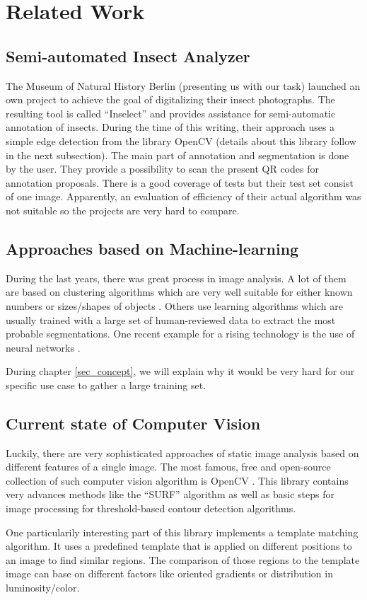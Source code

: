 %
\section{Related Work}
\label{sec_related}

\subsection{Semi-automated Insect Analyzer}

The Museum of Natural History Berlin (presenting us with our task) launched an own project to achieve the goal of digitalizing their insect photographs. 
The resulting tool is called ``Inselect'' \cite{Inselect} and provides assistance for semi-automatic annotation of insects. 
During the time of this writing, their approach uses a simple edge detection from the library OpenCV (details about this library follow in the next subsection).
The main part of annotation and segmentation is done by the user. 
They provide a possibility to scan the present QR codes for annotation proposals.
There is a good coverage of tests but their test set consist of one image. 
Apparently, an evaluation of efficiency of their actual algorithm was not suitable so the projects are very hard to compare.

\subsection{Approaches based on Machine-learning}

During the last years, there was great process in image analysis. 
A lot of them are based on clustering algorithms which are very well suitable for either known numbers or sizes/shapes of objects \cite{Pappas}. 
Others use learning algorithms which are usually trained with a large set of human-reviewed data to extract the most probable segmentations.
One recent example for a rising technology is the use of neural networks \cite{turagal}.

During chapter \ref{sec_concept}, we will explain why it would be very hard for our specific use case to gather a large training set.

\subsection{Current state of Computer Vision}

Luckily, there are very sophisticated approaches of static image analysis based on different features of a single image.
The most famous, free and open-source collection of such computer vision algorithm is OpenCV \cite{opencv_library}. 
This library contains very advances methods like the ``SURF'' algorithm as well as basic steps for image processing for threshold-based contour detection algorithms.

One particularily interesting part of this library implements a template matching algorithm. 
It uses a predefined template that is applied on different positions to an image to find similar regions.
The comparison of those regions to the template image can base on different factors like oriented gradients or distribution in luminosity/color.